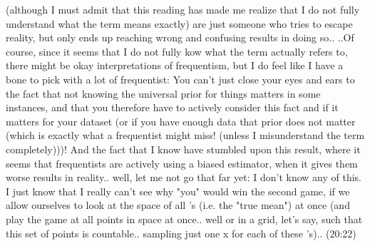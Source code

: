 \documentclass{report}
\begin{document}
(although I must admit that this reading has made me realize that I do not fully understand what the term means exactly) are just someone who tries to escape reality, but only ends up reaching wrong and confusing results in doing so.. ..Of course, since it seems that I do not fully kow what the term actually refers to, there might be okay interpretations of frequentism, but I do feel like I have a bone to pick with a lot of frequentist: You can't just close your eyes and ears to the fact that not knowing the universal prior for things matters in some instances, and that you therefore have to actively consider this fact and if it matters for your dataset (or if you have enough data that prior does not matter (which is exactly what a frequentist might miss! (unless I misunderstand the term completely)))! And the fact that I know have stumbled upon this result, where it seems that frequentists are actively using a biased estimator, when it gives them worse results in reality.. well, let me not go that far yet: I don't know any of this. I just know that I really can't see why "you" would win the second game, if we allow ourselves to look at the space of all \theta's (i.e. the "true mean") at once (and play the game at all points in \theta space at once.. well or in a grid, let's say, such that this set of points is countable.. sampling just one x for each of these \theta's).. (20:22)
\end{document}
